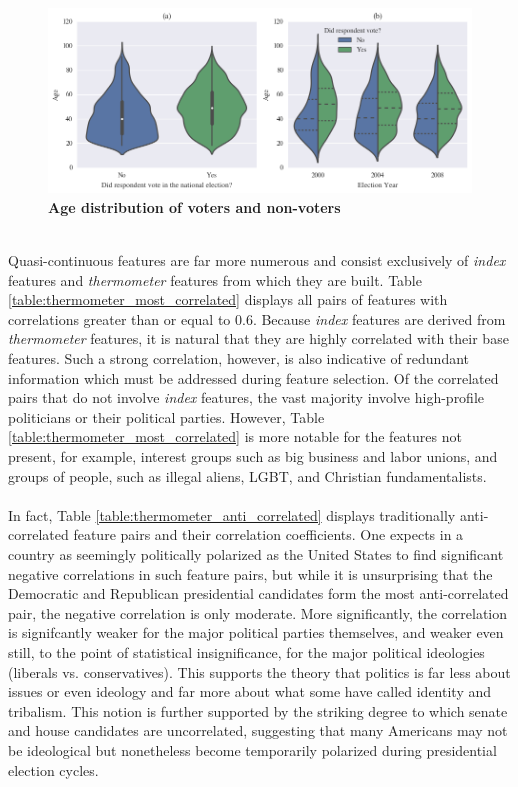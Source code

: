 \documentclass{article}
\begin{document}
	\begin{figure}[h!]
		\begin{center}
			\includegraphics*[width=1\linewidth]{age}
			\caption{\textbf{Age distribution of voters and non-voters}}
			\label{fig:age_distribution}
		\end{center}
	\end{figure}
	\hfill \\
	Quasi-continuous features are far more numerous and consist exclusively of \textit{index} features and \textit{thermometer} features from which they are built. Table \ref{table:thermometer_most_correlated} displays all pairs of features with correlations greater than or equal to 0.6. Because \textit{index} features are derived from \textit{thermometer} features, it is natural that they are highly correlated with their base features. Such a strong correlation, however, is also indicative of redundant information which must be addressed during feature selection. Of the correlated pairs that do not involve \textit{index} features, the vast majority involve high-profile politicians or their political parties. However, Table \ref{table:thermometer_most_correlated} is more notable for the features not present, for example, interest groups such as big business and labor unions, and groups of people, such as illegal aliens, LGBT, and Christian fundamentalists.
	\\\\
	In fact, Table \ref{table:thermometer_anti_correlated} displays traditionally anti-correlated feature pairs and their correlation coefficients. One expects in a country as seemingly politically polarized as the United States to find significant negative correlations in such feature pairs, but while it is unsurprising that the Democratic and Republican presidential candidates form the most anti-correlated pair, the negative correlation is only moderate. More significantly, the correlation is signifcantly weaker for the major political parties themselves, and weaker even still, to the point of statistical insignificance, for the major political ideologies (liberals vs. conservatives). This supports the theory that politics is far less about issues or even ideology and far more about what some have called identity and tribalism. This notion is further supported by the striking degree to which senate and house candidates are uncorrelated, suggesting that many Americans may not be ideological but nonetheless become temporarily polarized during presidential election cycles. 
	
\end{document}
